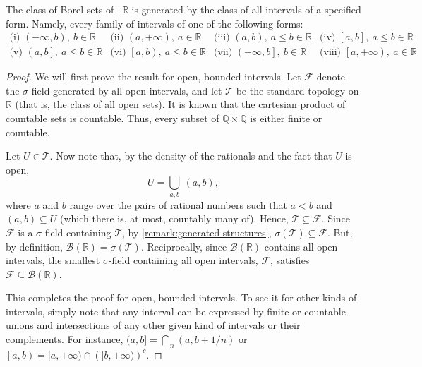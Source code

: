 \begin{prop}\label{proposition:Borel sets on R} The class of
Borel sets of ~\(\mathbb{R}\) is generated by the class of all intervals of a
specified form. Namely, every family of intervals of one of the following forms:
\[
  \begin{array}{llll}
\text{(i) }\left(-\infty,b\right), ~ b\in\mathbb{R}&
\text{(ii) }\left(a,+\infty\right),~ a\in\mathbb{R}&
\text{(iii) }\left(a,b\right),~ a\leq b\in\mathbb{R}&
\text{(iv) }\left[a,b\right],~ a\leq b\in\mathbb{R}\\
\text{(v) }\left(a,b\right],~ a\leq b\in\mathbb{R}&
\text{(vi) }\left[a,b\right),~ a\leq b\in\mathbb{R}&
\text{(vii) }\left(-\infty,b\right],~ b\in\mathbb{R}&
\text{(viii) }\left[a,+\infty\right),~ a\in\mathbb{R}
  \end{array}
\]
\end{prop}
\begin{proof}
We will first prove the result for open, bounded intervals. Let \(\mathcal{F}\) denote the \(\sigma\)-field generated by all open intervals, and let \(\mathcal{T}\) be the standard topology on \(\mathbb{R}\) (that is, the class of all open sets). It is known that the cartesian product of countable sets is countable. Thus, every subset of \(\mathbb{Q}\times\mathbb{Q}\) is either finite or
countable.
		
Let \(U\in\mathcal{T}\). Now note that, by the density
of the rationals and the fact that \(U\) is open,
\[
		U=\bigcup_{a,b}~(a,b)
,\]
where \(a\) and \(b\) range over the pairs of rational numbers such that \(a<b\) and \((a,b)\subseteq U\) (which there is, at most, countably many of). Hence, \(\mathcal{T}\subseteq\mathcal{F}\). Since \(\mathcal{F}\) is a \(\sigma\)-field containing \(\mathcal{T}\), by \cref{remark:generated structures}, \(\sigma(\mathcal{T})\subseteq\mathcal{F}\). But, by definition, \(\mathscr{B}\left(\mathbb{R}\right)=\sigma(\mathcal{T})\). Reciprocally, since \(\mathscr{B}\left(\mathbb{R}\right)\) contains all open intervals, the smallest \(\sigma\)-field containing all open intervals, \(\mathcal{F}\), satisfies \(\mathcal{F}\subseteq\mathscr{B}\left(\mathbb{R}\right)\).
    
This completes the proof for open, bounded intervals. To
see it for other kinds of intervals, simply note that any interval can be
expressed by finite or countable unions and intersections of any other given
kind of intervals or their complements. For instance,
\((a,b]=\bigcap_{n}{(a,b+1/n)}\) or
\(\left[a,b\right)=[a,+\infty)\cap \left([b,+\infty)\right)^{c}\).
\end{proof}
